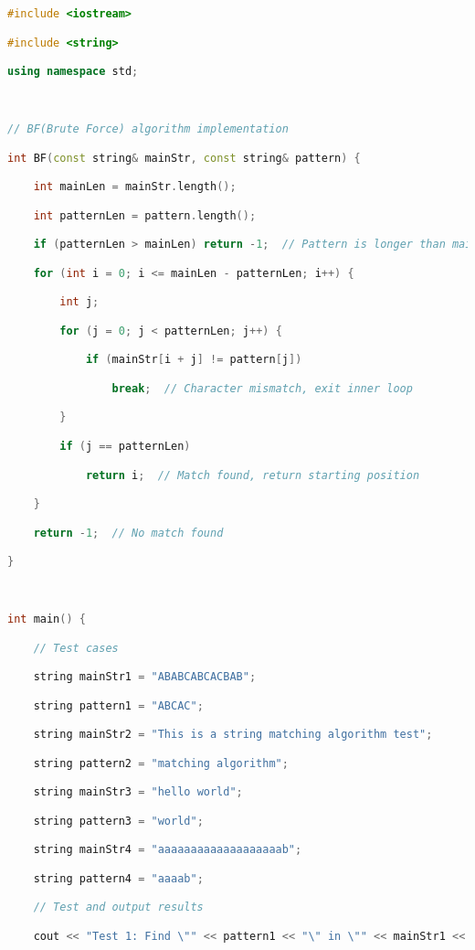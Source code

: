 \begin{lstlisting}[language=C++]
#include <iostream>

#include <string>

using namespace std;

  

// BF(Brute Force) algorithm implementation

int BF(const string& mainStr, const string& pattern) {

    int mainLen = mainStr.length();

    int patternLen = pattern.length();

    if (patternLen > mainLen) return -1;  // Pattern is longer than main string, no match possible

    for (int i = 0; i <= mainLen - patternLen; i++) {

        int j;

        for (j = 0; j < patternLen; j++) {

            if (mainStr[i + j] != pattern[j])

                break;  // Character mismatch, exit inner loop

        }

        if (j == patternLen)

            return i;  // Match found, return starting position

    }

    return -1;  // No match found

}

  

int main() {

    // Test cases

    string mainStr1 = "ABABCABCACBAB";

    string pattern1 = "ABCAC";

    string mainStr2 = "This is a string matching algorithm test";

    string pattern2 = "matching algorithm";

    string mainStr3 = "hello world";

    string pattern3 = "world";

    string mainStr4 = "aaaaaaaaaaaaaaaaaaab";

    string pattern4 = "aaaab";

    // Test and output results

    cout << "Test 1: Find \"" << pattern1 << "\" in \"" << mainStr1 << "\"" << endl;


\end{lstlisting}
